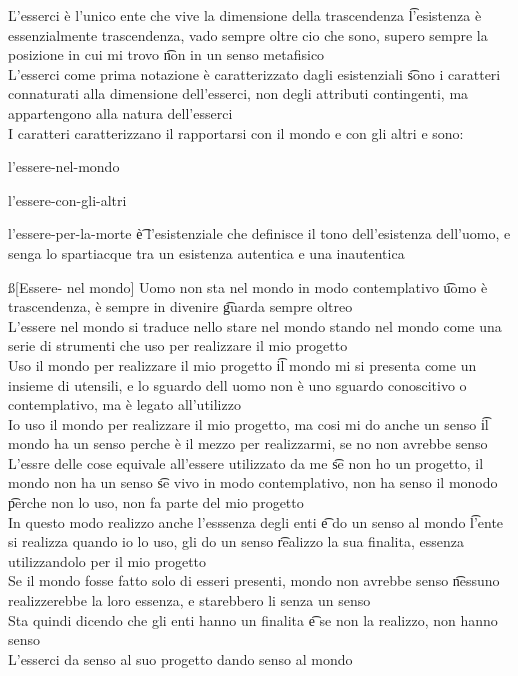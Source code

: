 \documentclass[12pt]{article}
\begin{document}
\v

L'esserci è l'unico ente che vive la dimensione della trascendenza \t l'esistenza è essenzialmente trascendenza, vado sempre oltre cio che sono, supero sempre la posizione in cui mi trovo \t non in un senso metafisico \\
L'esserci come prima notazione è caratterizzato dagli esistenziali \t sono i caratteri connaturati alla dimensione dell'esserci, non degli attributi contingenti, ma appartengono alla natura dell'esserci \\
I caratteri caratterizzano il rapportarsi con il mondo e con gli altri e sono:
\bi
    \item l'essere-nel-mondo
    \item l'essere-con-gli-altri
    \item l'essere-per-la-morte \t è l'esistenziale che definisce il tono dell'esistenza dell'uomo, e senga lo spartiacque tra un esistenza autentica e una inautentica
\ei

\ss[Essere- nel mondo]
Uomo non sta nel mondo in modo contemplativo \t uomo è trascendenza, è sempre in divenire \t guarda sempre oltreo \\
L'essere nel mondo si traduce nello stare nel mondo stando nel mondo come una serie di strumenti che uso per realizzare il mio progetto \\
Uso il mondo per realizzare il mio progetto \t il mondo mi si presenta come un insieme di utensili, e lo sguardo dell uomo non è uno sguardo conoscitivo o contemplativo, ma è legato all'utilizzo \\
Io uso il mondo per realizzare il mio progetto, ma cosi mi do anche un senso \t il mondo ha un senso perche è il mezzo per realizzarmi, se no non avrebbe senso \\
L'essre delle cose equivale all'essere utilizzato da me \t se non ho un progetto, il mondo non ha un senso \t se vivo in modo contemplativo, non ha senso il monodo \t perche non lo uso, non fa parte del mio progetto \\
In questo modo realizzo anche l'esssenza degli enti \t e do un senso al mondo \t l'ente si realizza quando io lo uso, gli do un senso \t realizzo la sua finalita, essenza utilizzandolo per il mio progetto \\
Se il mondo fosse fatto solo di esseri presenti, mondo non avrebbe senso \t nessuno realizzerebbe la loro essenza, e starebbero li senza un senso \\
Sta quindi dicendo che gli enti hanno un finalita \t e se non la realizzo, non hanno senso \\
L'esserci da senso al suo progetto dando senso al mondo
\end{document}
